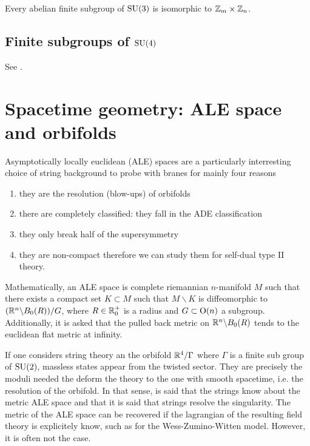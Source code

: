         \begin{theorem*}
            Every abelian finite subgroup of $\text{SU}(3)$ is isomorphic to $\mathbb{Z}_m\times\mathbb{Z}_n$.
        \end{theorem*}

    \subsection{Finite subgroups of $\text{SU}(4)$}

        See \cite{Hanany:1999sp}.

\section{Spacetime geometry: ALE space and orbifolds}\label{app:spacetimegeom}

    Asymptotically locally euclidean (ALE) spaces are a particularly interresting choice of string background to probe with branes for mainly four reasons
    \begin{enumerate}[label=(\roman*)]
        \item they are the resolution (blow-ups) of orbifolds
        \item there are completely classified: they fall in the ADE classification
        \item they only break half of the supersymmetry
        \item they are non-compact therefore we can study them for self-dual type II theory. 
    \end{enumerate}
    Mathematically, an ALE space is complete riemannian $n$-manifold $M$ such that there exists a compact set $K\subset M$ such that $M\backslash K$ is diffeomorphic to $(\mathbb{R}^n\backslash B_0(R))/G$, where $R\in\mathbb{R}^+_0$ is a radius and $G\subset\text{O}(n)$ a subgroup. Additionally, it is asked that the pulled back metric on $\mathbb{R}^n\backslash B_0(R)$ tends to the euclidean flat metric at infinity.

    If one considers string theory an the orbifold $\mathbb{R}^4/\Gamma$ where $\Gamma$ is a finite sub group of $\text{SU}(2)$, massless states appear from the twisted sector. They are precisely the moduli needed the deform the theory to the one with smooth spacetime, i.e. the resolution of the orbifold. In that sense, is said that the strings know about the metric ALE space and that it is said that strings resolve the singularity. The metric of the ALE space can be recovered if the lagrangian of the resulting field theory is explicitely know, such as for the Wess-Zumino-Witten model. However, it is often not the case.

